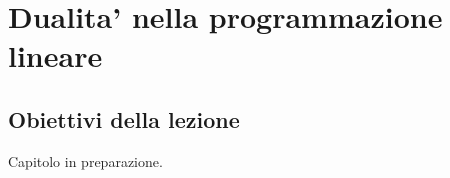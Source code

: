 
\chapter{Dualita' nella programmazione lineare}

\section{Obiettivi della lezione}

Capitolo in preparazione.

